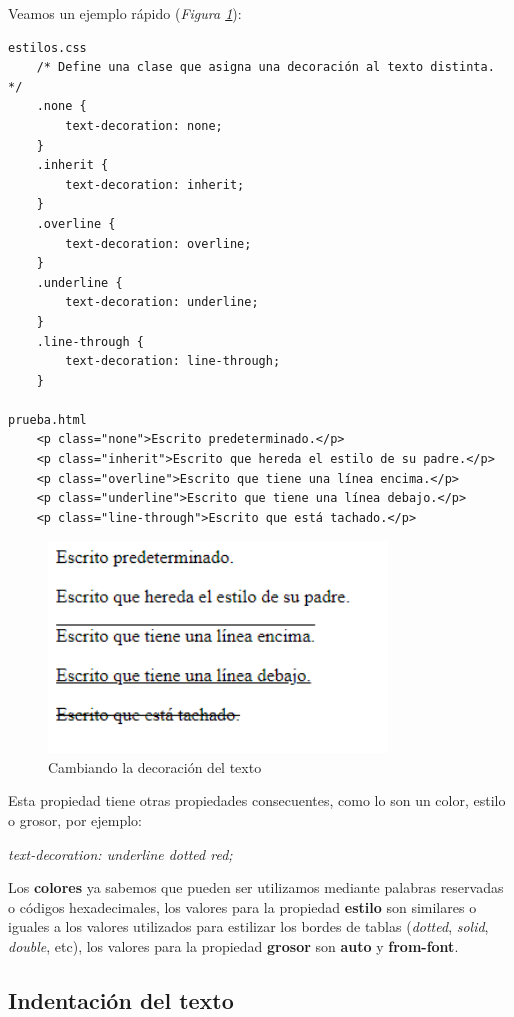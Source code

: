 Veamos un ejemplo rápido (\textit{Figura \ref{fig: 12}}):
\begin{lstlisting}
estilos.css
    /* Define una clase que asigna una decoración al texto distinta. */
    .none {
        text-decoration: none;
    }
    .inherit {
        text-decoration: inherit;
    }
    .overline {
        text-decoration: overline;
    }
    .underline {
        text-decoration: underline;
    }
    .line-through {
        text-decoration: line-through;
    }
    
prueba.html
    <p class="none">Escrito predeterminado.</p>
    <p class="inherit">Escrito que hereda el estilo de su padre.</p>
    <p class="overline">Escrito que tiene una línea encima.</p>
    <p class="underline">Escrito que tiene una línea debajo.</p>
    <p class="line-through">Escrito que está tachado.</p>
\end{lstlisting}
\begin{figure}[H]
    \centering
    \caption{Cambiando la decoración del texto}
    \label{fig: 12}
    \includegraphics[width=9cm]{ss/fuentes-deco.png}
\end{figure}

Esta propiedad tiene otras propiedades consecuentes, como lo son un color, estilo o grosor, por ejemplo:
\begin{center}
    \textit{text-decoration: underline dotted red;}
\end{center}

Los \textbf{colores} ya sabemos que pueden ser utilizamos mediante palabras reservadas o códigos hexadecimales, los valores para la propiedad \textbf{estilo} son similares o iguales a los valores utilizados para estilizar los bordes de tablas (\textit{dotted}, \textit{solid}, \textit{double}, etc), los valores para la propiedad \textbf{grosor} son \textbf{auto} y \textbf{from-font}.


\subsection{Indentación del texto}

